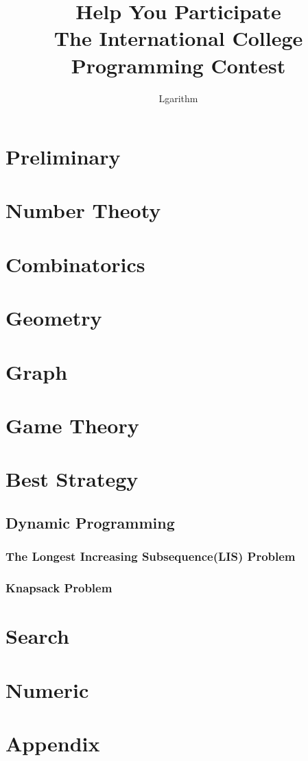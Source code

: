\documentclass{book}
\title{{\Huge Help You Participate}\\
		{\large The International College Programming Contest}}
\author{Lgarithm}
\begin{document}
\maketitle
\tableofcontents
\chapter{Preliminary}
	
\chapter{Number Theoty}
	
\chapter{Combinatorics}
	
\chapter{Geometry}
	
\chapter{Graph}
	
\chapter{Game Theory}
	
\chapter{Best Strategy}
	\section{Dynamic Programming}
		\subsection{The Longest Increasing Subsequence(LIS) Problem}
		\subsection{Knapsack Problem}
\chapter{Search}
	
\chapter{Numeric}
	

\chapter*{Appendix}
    


\end{document}
